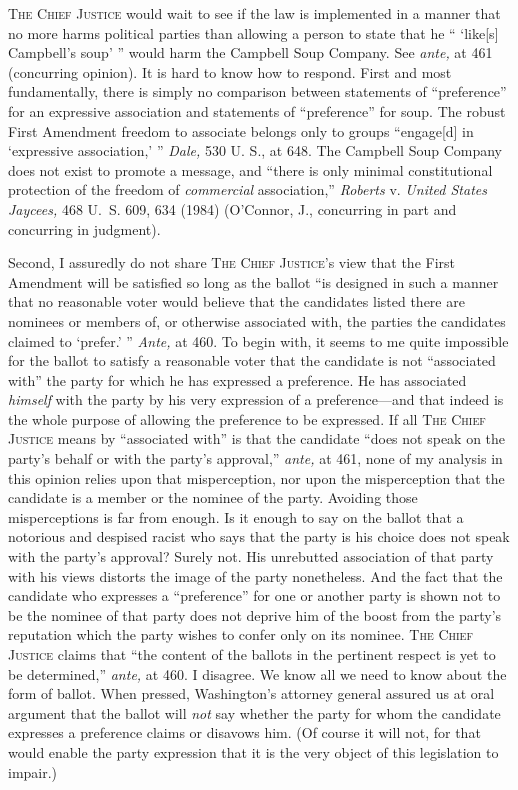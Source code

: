   \textsc{The Chief Justice} would wait to see if the law is implemented in
a manner that no more harms political parties than allowing a person to
state that he `` ‘like[s] Campbell's soup' '' would harm the
Campbell Soup Company. See \emph{ante,} at 461 (concurring opinion).
It is hard to know how to respond. First and most fundamentally, there
is simply no comparison between statements of ``preference'' for an
expressive association and statements of ``preference'' for soup.
The robust First Amendment freedom to associate belongs only to groups
``engage[d] in ‘expressive association,' '' \emph{Dale,} 530 U.
S., at 648. The Campbell Soup Company does not exist to promote a
message, and ``there is only minimal constitutional protection of the
freedom of \emph{commercial} association,'' \emph{Roberts} v. \emph{United
States Jaycees,} 468 U.~S. 609, 634 (1984) (O'Connor, J., concurring
in part and concurring in judgment).

  Second, I assuredly do not share \textsc{The Chief Justice}'s view that
the First Amendment will be satisfied so long as the ballot ``is
designed in such a manner that no reasonable voter would believe that
the candidates listed there are nominees or members of, or otherwise
associated with, the parties the candidates claimed to ‘prefer.' ''
\emph{Ante,} at 460. To begin with, it seems to me quite impossible
for the ballot to satisfy a reasonable voter that the candidate is
not ``associated with'' the party for which he has expressed a
preference. He has associated \emph{himself} with the party by his very
expression of a preference---and that indeed is the whole purpose of
allowing the preference to be expressed. If all \textsc{The Chief Justice}
means by ``associated with'' is that the candidate ``does not
speak on the party's behalf or with the party's approval,''
\emph{ante,} at 461, none of my analysis in this opinion relies upon
that misperception, nor upon the misperception that the candidate is a
member or the nominee of the party. Avoiding those misperceptions is far
from enough. \newpage  Is it enough to say on the ballot that a notorious
and despised racist who says that the party is his choice does not speak
with the party's approval? Surely not. His unrebutted association of
that party with his views distorts the image of the party nonetheless.
And the fact that the candidate who expresses a ``preference'' for
one or another party is shown not to be the nominee of that party does
not deprive him of the boost from the party's reputation which the
party wishes to confer only on its nominee. \textsc{The Chief Justice} claims
that ``the content of the ballots in the pertinent respect is yet to
be determined,'' \emph{ante,} at 460. I disagree. We know all we need
to know about the form of ballot. When pressed, Washington's attorney
general assured us at oral argument that the ballot will \emph{not} say
whether the party for whom the candidate expresses a preference claims
or disavows him. (Of course it will not, for that would enable the party
expression that it is the very object of this legislation to impair.)

